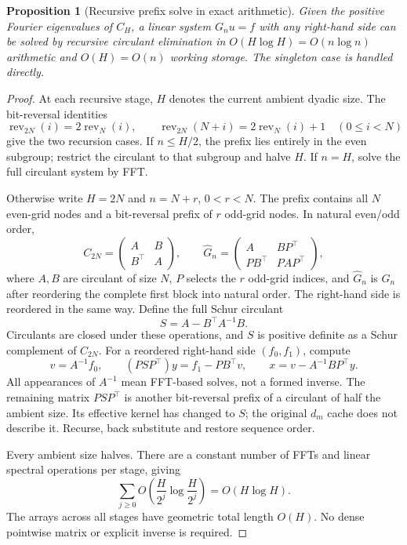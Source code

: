 \documentclass[11pt]{article}
\newtheorem{proposition}{Proposition}
\begin{document}
\begin{proposition}[Recursive prefix solve in exact arithmetic]\label{prop:fft}
Given the positive Fourier eigenvalues of $C_H$, a linear system
$G_nu=f$ with any right-hand side can be solved by recursive circulant
elimination in $O(H\log H)=O(n\log n)$ arithmetic and $O(H)=O(n)$
working storage. The singleton case is handled directly.
\end{proposition}
\begin{proof}
At each recursive stage, $H$ denotes the current ambient dyadic size.
The bit-reversal identities
\[
 \operatorname{rev}_{2N}(i)=2\operatorname{rev}_N(i),\qquad
 \operatorname{rev}_{2N}(N+i)=2\operatorname{rev}_N(i)+1
 \quad(0\le i<N)
\]
give the two recursion cases. If $n\le H/2$, the prefix lies entirely
in the even subgroup; restrict the circulant to that subgroup and
halve $H$. If $n=H$, solve the full circulant system by FFT.

Otherwise write $H=2N$ and $n=N+r$, $0<r<N$.
The prefix contains all $N$ even-grid nodes and a bit-reversal prefix
of $r$ odd-grid nodes. In natural even/odd order,
\[
 C_{2N}=\begin{pmatrix} A&B\\ B^\top&A\end{pmatrix},
 \qquad
 \widehat G_n=
 \begin{pmatrix} A&BP^\top\\ PB^\top&PAP^\top\end{pmatrix},
\]
where $A,B$ are circulant of size $N$, $P$ selects the $r$ odd-grid
indices, and $\widehat G_n$ is $G_n$ after reordering the complete
first block into natural order. The right-hand side is reordered
in the same way. Define the full Schur circulant
\begin{equation}\label{eq:schur}
 S=A-B^\top A^{-1}B.
\end{equation}
Circulants are closed under these operations, and $S$ is positive
definite as a Schur complement of $C_{2N}$.
For a reordered right-hand side $(f_0,f_1)$, compute
\[
 v=A^{-1}f_0,\qquad
 (PSP^\top)y=f_1-PB^\top v,\qquad
 x=v-A^{-1}BP^\top y.
\]
All appearances of $A^{-1}$ mean FFT-based solves, not a formed
inverse. The remaining matrix $PSP^\top$ is another bit-reversal
prefix of a circulant of half the ambient size. Its effective
kernel has changed to $S$; the original $d_m$ cache does not describe it.
Recurse, back substitute and restore sequence order.

Every ambient size halves. There are a constant number of FFTs and
linear spectral operations per stage, giving
\[
 \sum_{j\ge0}O\!\left(\frac{H}{2^j}
                      \log\frac{H}{2^j}\right)=O(H\log H).
\]
The arrays across all stages have geometric total length $O(H)$.
No dense pointwise matrix or explicit inverse is required.
\end{proof}
\end{document}
